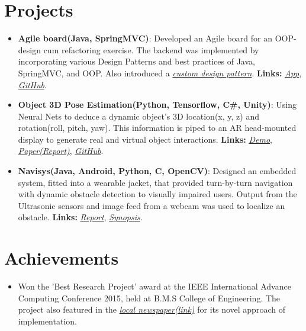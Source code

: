 \documentclass[letterpaper,11pt]{article}
\newcommand{\resumeItem}[2]{
  \item\small{
    \textbf{#1}{: #2 \vspace{-2pt}}
  }
}
\newcommand{\resumePoint}[1]{
  \item\small{#1}
}
\newcommand{\resumeSubItem}[2]{\resumeItem{#1}{#2}\vspace{-4pt}}
\newcommand{\resumeSubHeadingListStart}{\begin{itemize}[leftmargin=*]}
\newcommand{\resumeSubHeadingListEnd}{\end{itemize}\vspace{-10pt}}
\begin{document}
%

\section{Projects}
  \resumeSubHeadingListStart
    \resumeSubItem{Agile board(Java, SpringMVC)}
      {Developed an Agile board for an OOP-design cum refactoring exercise. The backend was implemented by incorporating various Design Patterns and best practices of Java, SpringMVC, and OOP. Also introduced a \href{https://github.com/nikhilsu/Agile-board/blob/master/src/main/java/com/prorg/helper/result/Response.java}{\emph{custom design pattern}}. \textbf{Links:}
      \href{https://prorg.herokuapp.com}{\textit{App}}, \href{https://github.com/nikhilsu/Agile-board}{\textit{GitHub}}.}
    \resumeSubItem{Object 3D Pose Estimation(Python, Tensorflow, C\#, Unity)}
      {Using Neural Nets to deduce a dynamic object\rq s 3D location(x, y, z) and rotation(roll, pitch, yaw). This information is piped to an AR head-mounted display to generate real and virtual object interactions. \textbf{Links:}
      \href{https://drive.google.com/file/d/1kCepKQxR73tUTLuvmd1YL3sIbj1GxDdc/view?usp=sharing}{\textit{Demo}}, \href{https://drive.google.com/file/d/1mRwSJ8p2-g-gtBGl1A8seRB8SojWQphm/view?usp=sharing}{\textit{Paper(Report)}}, \href{https://github.com/nikhilsu/Object-location-detection}{\textit{GitHub}}.}
    \resumeSubItem{Navisys(Java, Android, Python, C, OpenCV)}
      {Designed an embedded system, fitted into a wearable jacket, that provided turn-by-turn navigation with dynamic obstacle detection to visually impaired users.  Output from the Ultrasonic sensors and image feed from a webcam was used to localize an obstacle. \textbf{Links:}
      \href{https://drive.google.com/file/d/1bFHeZ7-7uwZ0spir3YQ7r0maWdLteEtu/view?usp=sharing}{\textit{Report}},
      \href{https://drive.google.com/file/d/1JWB67U2jjTG7cXZFVjRPVGKsv-rRhgUQ/view?usp=sharing}{\textit{Synopsis}}.}
    \resumeSubHeadingListEnd

\section{Achievements}
  \resumeSubHeadingListStart
    \resumePoint{Won the 'Best Research Project' award at the IEEE International Advance Computing Conference 2015, held at B.M.S College of Engineering. The project also featured in the \href{https://drive.google.com/open?id=0B0vNhKZyi8qyam1fQ3lfaE1hMkE}{\emph{local newspaper(link)}} for its novel approach of implementation.}
  \resumeSubHeadingListEnd
\end{document}
